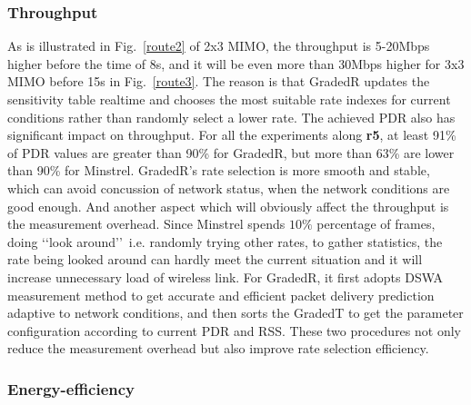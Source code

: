 \documentclass[draftclsnofoot,journal,onecolumn,11pt]{IEEEtran}
\begin{document}
\subsubsection{Throughput}
As is illustrated in Fig.~\ref{route2} of 2x3 MIMO, the throughput is 5-20Mbps higher before the time of 8s, and it will be even more than 30Mbps higher for 3x3 MIMO before 15s in Fig.~\ref{route3}. The reason is that GradedR updates the sensitivity table realtime and chooses the most suitable rate indexes for current conditions rather than randomly select a lower rate. The achieved PDR also has significant impact on throughput. For all the experiments along \textbf{r5}, at least 91\% of PDR values are greater than 90\% for GradedR, but more than 63\% are lower than 90\% for Minstrel. GradedR's rate selection is more smooth and stable, which can avoid concussion of network status, when the network conditions are good enough. And another aspect which will obviously affect the throughput is the measurement overhead. Since Minstrel spends $10\%$ percentage of frames, doing \lq\lq look around\rq\rq~i.e. randomly trying other rates, to gather statistics, the rate being looked around can hardly meet the current situation and it will increase unnecessary load of wireless link. For GradedR, it first adopts DSWA measurement method to get accurate and efficient packet delivery prediction adaptive to network conditions, and then sorts the GradedT to get the parameter configuration according to current PDR and RSS. These two procedures not only reduce the measurement overhead but also improve rate selection efficiency.
\subsubsection{Energy-efficiency}



\renewcommand\refname{References}
%


\end{document}
